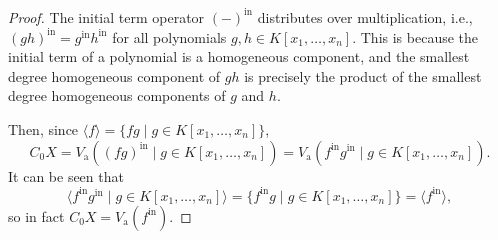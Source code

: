 \documentclass[12pt]{article}
\theoremstyle{definition}
\newcommand{\<}{\langle}
\renewcommand{\>}{\rangle}
\newcommand{\Va}{V_{\mathrm{a}}}
\newcommand{\init}{\mathrm{in}}
\begin{document}
\begin{proof}
    The initial term operator $(-)^\init$ distributes over multiplication, i.e., $(gh)^\init = g^\init h^\init$ for all polynomials $g, h \in K[x_1, \dots, x_n]$. This is because the initial term of a polynomial is a homogeneous component, and the smallest degree homogeneous component of $gh$ is precisely the product of the smallest degree homogeneous components of $g$ and $h$.
    
    Then, since $\<f\> = \{fg \mid g \in K[x_1, \dots, x_n]\}$,
    \[
        C_0X = \Va((fg)^\init \mid g \in K[x_1, \dots, x_n]) = \Va(f^\init g^\init \mid g \in K[x_1, \dots, x_n]).
    \]
    It can be seen that
    \[
        \<f^\init g^\init \mid g \in K[x_1, \dots, x_n]\> = \{f^\init g \mid g \in K[x_1, \dots, x_n]\} = \<f^\init\>,
    \]
    so in fact $C_0X = \Va(f^\init)$.

\end{proof}
\end{document}

